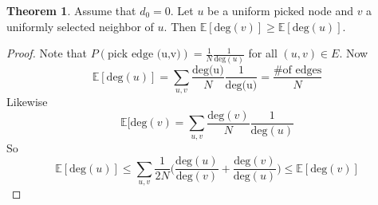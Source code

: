 \documentclass{article}
\theoremstyle{definition}
\newtheorem{theorem}{Theorem}
\begin{document}
\begin{theorem} Assume that $d_0 = 0$. Let $u$ be a uniform picked node and $v$ a uniformly selected neighbor of $u$. Then $\mathbb{E}[\text{deg}(v)] \geq \mathbb{E}[\text{deg}(u)]$.
\end{theorem} 
\begin{proof} Note that $P(\text{pick edge (u,v)}) = \frac{1}{N}\frac{1}{\text{deg}(u)}$ for all $(u,v) \in E$. Now 
\[\mathbb{E}[\text{deg}(u)] = \sum_{u,v}{\frac{\text{deg(u)}}{N}\frac{1}{\text{deg(u)}}} = \frac{\text{\# of edges}}{N}\]
Likewise \[\mathbb{E}[\text{deg}(v) = \sum_{u,v}{\frac{\text{deg}(v)}{N}\frac{1}{\text{deg}(u)}}\]
So 
\[\mathbb{E}[\text{deg}(u)] \leq \sum_{u,v}{\frac{1}{2N}\Big(\frac{\text{deg}(u)}{\text{deg}(v)}+\frac{\text{deg}(v)}{\text{deg}(u)}\Big)} \leq \mathbb{E}[\text{deg}(v)]\]
\end{proof}
\end{document}
